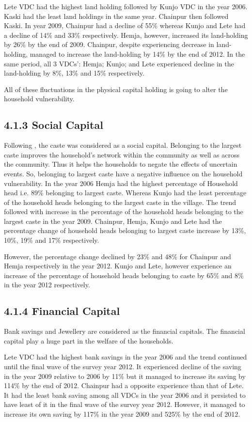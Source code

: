 Lete VDC had the highest land holding followed by Kunjo VDC in the year 2006. Kaski had the least land holdings in the same year. Chainpur then followed Kaski. In year 2009, Chainpur had a decline of 55\% whereas Kunjo and Lete had a decline of 14\% and 33\% respectively. Hemja, however, increased its land-holding by 26\% by the end of 2009. Chainpur, despite experiencing decrease in land-holding, managed to increase the land-holding by 14\% by the end of 2012. In the same period, all 3 VDCs': Hemja; Kunjo; and Lete experienced decline in the land-holding by 8\%, 13\% and 15\% respectively. 

All of these fluctuations in the physical capital holding is going to alter the household vulnerability.  

\subsection*{4.1.3 Social Capital}  
Following \cite{alha2018other, vanneman2006social}, the caste was considered as a social capital. Belonging to the largest caste improves the household's network within the community as well as across the community. Thus it helps the households to negate the effects of uncertain events. So, belonging to largest caste have a negative influence on the household vulnerability. In the year 2006 Hemja had the highest percentage of Household head i.e. 89\% belonging to largest caste. Whereas Kunjo had the least percentage of the household heads belonging to the largest caste in the village. The trend followed with increase in the percentage of the household heads belonging to the largest caste in the year 2009. Chainpur, Hemja, Kunjo and Lete had the percentage change of household heads belonging to largest caste increase by 13\%, 10\%, 19\% and 17\% respectively. 

However, the percentage change declined by 23\% and 48\% for Chainpur and Hemja respectively in the year 2012. Kunjo and Lete, however experience an increase of the percentage of household heads belonging to caste by 65\% and 8\% in the year 2012 respectively. 

\subsection*{4.1.4 Financial Capital}
Bank savings and Jewellery are considered as the financial capitals. The financial capital play a huge part in the welfare of the households. 

Lete VDC had the highest bank savings in the year 2006 and the trend continued until the final wave of the survey year 2012. It experienced decline of the saving in the year 2009 relative to 2006 by 11\% but it managed to increase its saving by 114\% by the end of 2012. Chainpur had a opposite experience than that of Lete. It had the least bank saving among all VDCs in the year 2006 and it persisted to have least of it in the final wave of the survey year 2012. However, it managed to increase its own saving by 117\% in the year 2009 and 525\% by the end of 2012. 

